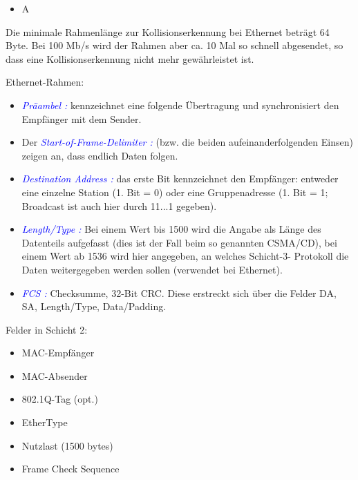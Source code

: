 \begin{itemize}
    \item  \todo A
\end{itemize}

Die minimale Rahmenlänge zur Kollisionserkennung bei Ethernet beträgt 64 Byte. Bei 100 Mb/s wird der Rahmen aber ca. 10 Mal so schnell abgesendet, so dass eine Kollisionserkennung nicht mehr gewährleistet ist.

Ethernet-Rahmen:
\begin{itemize}
    \item \textcolor{blue}{\textit{Präambel :}} kennzeichnet eine folgende Übertragung und synchronisiert den Empfänger mit dem Sender.
    \item Der \textcolor{blue}{\textit{Start-of-Frame-Delimiter :}} (bzw. die beiden aufeinanderfolgenden Einsen) zeigen an, dass endlich Daten folgen.
    \item \textcolor{blue}{\textit{Destination Address :}} das erste Bit kennzeichnet den Empfänger: entweder eine einzelne Station (1. Bit = 0) oder eine Gruppenadresse (1. Bit = 1; Broadcast ist auch hier durch 11...1 gegeben).
    \item \textcolor{blue}{\textit{Length/Type :}} Bei einem Wert bis 1500 wird die Angabe als Länge des Datenteils aufgefasst (dies ist der Fall beim so genannten CSMA/CD), bei einem Wert ab 1536 wird hier angegeben, an welches Schicht-3- Protokoll die Daten weitergegeben werden sollen (verwendet bei Ethernet).
    \item \textcolor{blue}{\textit{FCS :}} Checksumme, 32-Bit CRC. Diese erstreckt sich über die Felder DA, SA, Length/Type, Data/Padding.
\end{itemize}
Felder in Schicht 2:
\begin{itemize}
    \item MAC-Empfänger
    \item MAC-Absender
    \item 802.1Q-Tag (opt.)
    \item EtherType
    \item Nutzlast (1500 bytes)
    \item Frame Check Sequence
\end{itemize}

